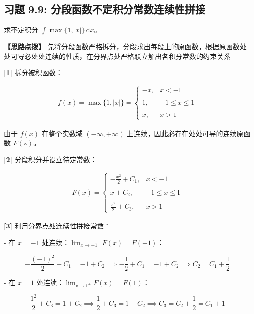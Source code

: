 \documentclass[11pt,a4paper,UTF8]{ctexart}
\begin{document}
\subsection{习题 9.9: 分段函数不定积分常数连续性拼接}

求不定积分 $\int \max\{1, |x|\}\,\mathrm{d}x$。

\textbf{\color{DeepPurple}【思路点拨】} 先将分段函数严格拆分，分段求出每段上的原函数，根据原函数处处可导必处处连续的性质，在分界点处严格联立解出各积分常数的约束关系


\begin{solbox}[分步推导与答题规范]
\textbf{[1]} 拆分被积函数：


\begin{align*}
f(x) = \max\{1, |x|\} = \begin{cases} -x, & x < -1 \\ \\ 1, & -1 \leqslant x \leqslant 1 \\ \\ x, & x > 1 \end{cases}
\end{align*}


由于 $f(x)$ 在整个实数域 $(-\infty, +\infty)$ 上连续，因此必存在处处可导的连续原函数 $F(x)$。

\textbf{[2]} 分段积分并设立待定常数：


\begin{align*}
F(x) = \begin{cases} -\frac{x^2}{2} + C_1, & x < -1 \\ \\ x + C_2, & -1 \leqslant x \leqslant 1 \\ \\ \frac{x^2}{2} + C_3, & x > 1 \end{cases}
\end{align*}


\textbf{[3]} 利用分界点处连续性拼接常数：

- 在 $x = -1$ 处连续：$\lim_{x \to -1^-} F(x) = F(-1)$：


\begin{equation*}
-\frac{(-1)^2}{2} + C_1 = -1 + C_2 \implies -\frac{1}{2} + C_1 = -1 + C_2 \implies C_2 = C_1 + \frac{1}{2}
\end{equation*}


- 在 $x = 1$ 处连续：$\lim_{x \to 1^+} F(x) = F(1)$：


\begin{equation*}
\frac{1^2}{2} + C_3 = 1 + C_2 \implies \frac{1}{2} + C_3 = 1 + C_2 \implies C_3 = C_2 + \frac{1}{2} = C_1 + 1
\end{equation*}



\end{solbox}
\end{document}

